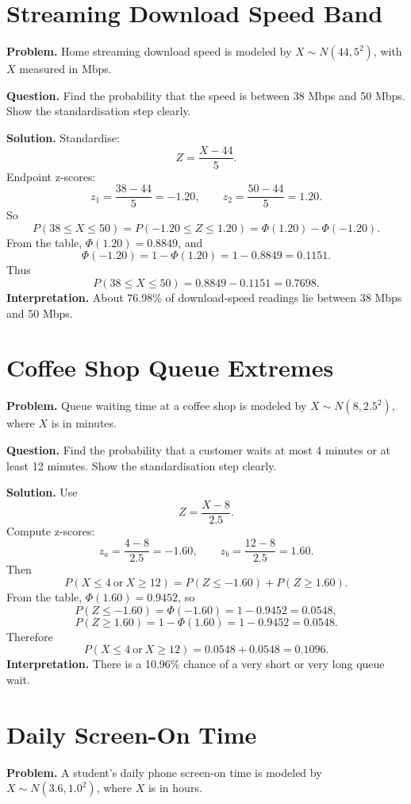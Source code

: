 \section{Streaming Download Speed Band}

\textbf{Problem.}
Home streaming download speed is modeled by
\(X\sim N(44,5^2)\), with \(X\) measured in Mbps.

\textbf{Question.}
Find the probability that the speed is between 38 Mbps and 50 Mbps.
Show the standardisation step clearly.

\textbf{Solution.}
Standardise:
\[
Z=\frac{X-44}{5}.
\]
Endpoint z-scores:
\[
z_1=\frac{38-44}{5}=-1.20,
\qquad
z_2=\frac{50-44}{5}=1.20.
\]
So
\[
P(38\le X\le 50)=P(-1.20\le Z\le 1.20)=\Phi(1.20)-\Phi(-1.20).
\]
From the table, \(\Phi(1.20)=0.8849\), and
\[
\Phi(-1.20)=1-\Phi(1.20)=1-0.8849=0.1151.
\]
Thus
\[
P(38\le X\le 50)=0.8849-0.1151=0.7698.
\]
\textbf{Interpretation.}
About 76.98\% of download-speed readings lie between 38 Mbps and 50 Mbps.

\section{Coffee Shop Queue Extremes}

\textbf{Problem.}
Queue waiting time at a coffee shop is modeled by
\(X\sim N(8,2.5^2)\), where \(X\) is in minutes.

\textbf{Question.}
Find the probability that a customer waits at most 4 minutes or at least 12 minutes.
Show the standardisation step clearly.

\textbf{Solution.}
Use
\[
Z=\frac{X-8}{2.5}.
\]
Compute z-scores:
\[
z_a=\frac{4-8}{2.5}=-1.60,
\qquad
z_b=\frac{12-8}{2.5}=1.60.
\]
Then
\[
P(X\le 4\ \text{or}\ X\ge 12)=P(Z\le -1.60)+P(Z\ge 1.60).
\]
From the table, \(\Phi(1.60)=0.9452\), so
\[
P(Z\le -1.60)=\Phi(-1.60)=1-0.9452=0.0548,
\]
\[
P(Z\ge 1.60)=1-\Phi(1.60)=1-0.9452=0.0548.
\]
Therefore
\[
P(X\le 4\ \text{or}\ X\ge 12)=0.0548+0.0548=0.1096.
\]
\textbf{Interpretation.}
There is a 10.96\% chance of a very short or very long queue wait.

\section{Daily Screen-On Time}

\textbf{Problem.}
A student's daily phone screen-on time is modeled by
\(X\sim N(3.6,1.0^2)\), where \(X\) is in hours.

